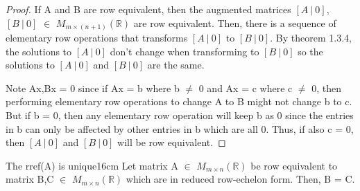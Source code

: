     \begin{proof}
        If A and B are row equivalent, then the augmented matrices
        $[A \ | \ 0]$,$[B \ | \ 0]$ $\in$ $M_{m \times (n+1)}(\mathbb{R})$
        are row equivalent.
        Then, there is a sequence of elementary
        row operations that transforms $[A \ | \ 0]$ to $[B \ | \ 0]$.
        By {\color{red} theorem 1.3.4}, the solutions to $[A \ | \ 0]$
        don't change when transforming to $[B \ | \ 0]$
        so the solutions to $[A \ | \ 0]$ and $[B \ | \ 0]$ are the same.

        Note Ax,Bx = 0 since if Ax = b where b $\not =$ 0
        and Ax = c where c $\not =$ 0,
        then performing elementary row operations to change A to B might
        not change b to c. But if b = 0, then any elementary row operation will
        keep b as 0 since the entries in b can only be affected by other entries
        in b which are all 0. Thus, if also c = 0, then $[A \ | \ 0]$
        and $[B \ | \ 0]$ will be row equivalent.
    \end{proof}

    \newpage


    
    \begin{wtheorem}{The rref(A) is unique}{16cm}
        Let matrix A $\in$ $M_{m \times n}(\mathbb{R})$
        be row equivalent to matrix B,C $\in$ $M_{m \times n}(\mathbb{R})$
        which are in reduced row-echelon form. Then, B = C.
    \end{wtheorem}


